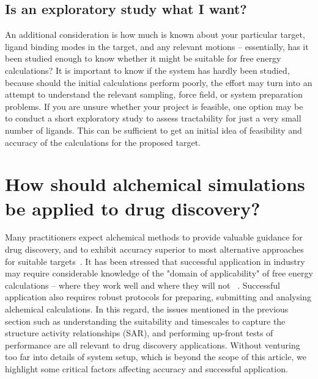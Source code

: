 \documentclass[9pt,bestpractices]{livecoms}
\begin{document}
\subsection{Is an exploratory study what I want?}
\label{subsec:exploration}
An additional consideration is how much is known about your particular
target, ligand binding modes in the target, and any relevant motions
-- essentially, has it been studied enough to know whether it might be
suitable for free energy calculations? It is important to know if the system has hardly been studied, because should the initial calculations perform poorly, the effort may turn into an attempt to understand the relevant sampling, force field, or system preparation problems.
%
If you are unsure whether your project is feasible, one option may be
to conduct a short exploratory study to assess tractability for just a very small
number of ligands. This can be sufficient to get an initial
idea of feasibility and accuracy of the calculations for the
proposed target.
%
\section{How should alchemical simulations be applied to drug discovery?}
\label{sec:drugdiscovery}
%
Many practitioners expect alchemical methods to provide valuable guidance for drug discovery, and to exhibit accuracy superior to most  alternative approaches for suitable targets~\cite{kuhn2017prospective}. It has been stressed that successful application in industry may require considerable knowledge of the "domain of applicability" of free energy calculations -- where they work well and where they will not ~\cite{sherborne2016collaborating}. Successful application also requires robust protocols for preparing, submitting and analysing alchemical calculations. In this regard, the issues mentioned in the previous section such as understanding the suitability and timescales to capture the structure activity relationships (SAR), and performing up-front tests of performance are all relevant to drug discovery applications. Without venturing too far into details of system setup, which is beyond the scope of this article, we highlight some critical factors affecting accuracy and successful application. 
%
\end{document}
